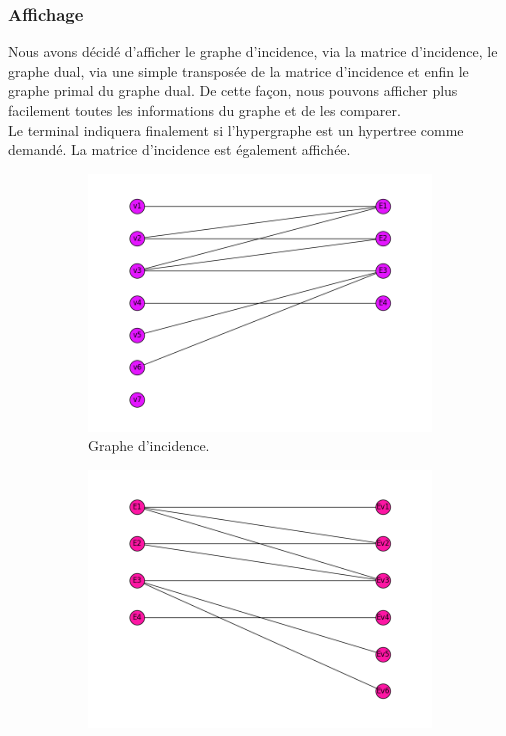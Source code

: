 \documentclass[a4papper]{article}
\begin{document}
		\subsubsection{Affichage}
			Nous avons décidé d'afficher le graphe d'incidence, via la matrice d'incidence, le graphe dual, via une simple transposée de la matrice d'incidence et enfin le graphe primal du graphe dual. De cette façon, nous pouvons afficher plus facilement toutes les informations du graphe et de les comparer.\\

			
			Le terminal indiquera finalement si l'hypergraphe est un hypertree comme demandé. La matrice d'incidence est également affichée.
			

\begin{figure}[h!]
	\centering
	\begin{subfigure}[b]{0.45\linewidth}
		\includegraphics[width=\linewidth]{graphe_d'incidence.png}
  		\caption{Graphe d'incidence.}
	\end{subfigure}
	\begin{subfigure}[b]{0.45\linewidth}
		\includegraphics[width=\linewidth]{graphe_dual.png}

\end{subfigure}
\end{figure}
\end{document}

